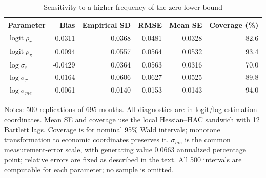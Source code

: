 \begin{table}[!htbp]
\centering
\caption{Sensitivity to a higher frequency of the zero lower bound}
\label{oa:tab_parameter_mc_sensitivity}
\begin{threeparttable}
\small
\begin{tabular*}{\textwidth}{@{\extracolsep{\fill}}lrrrrr}
\toprule
Parameter & Bias & Empirical SD & RMSE & Mean SE & Coverage (\%) \\
\midrule
$\operatorname{logit}\rho_r$ & 0.0311 & 0.0368 & 0.0481 & 0.0328 & 82.6 \\
$\operatorname{logit}\rho_\pi$ & 0.0094 & 0.0557 & 0.0564 & 0.0532 & 93.4 \\
$\log\sigma_r$ & -0.0429 & 0.0364 & 0.0563 & 0.0316 & 70.0 \\
$\log\sigma_\pi$ & -0.0164 & 0.0606 & 0.0627 & 0.0525 & 89.8 \\
$\log\sigma_{me}$ & 0.0061 & 0.0140 & 0.0153 & 0.0143 & 94.0 \\
\bottomrule
\end{tabular*}
\begin{tablenotes}[flushleft]
\footnotesize
\item Notes: 500 replications of 695 months. All diagnostics are in logit/log estimation coordinates. Mean SE and coverage use the local Hessian--HAC sandwich with 12 Bartlett lags. Coverage is for nominal 95\% Wald intervals; monotone transformation to economic coordinates preserves it. $\sigma_{me}$ is the common measurement-error scale, with generating value 0.0663 annualized percentage point; relative errors are fixed as described in the text. All 500 intervals are computable for each parameter; no sample is omitted.
\end{tablenotes}
\end{threeparttable}
\end{table}
